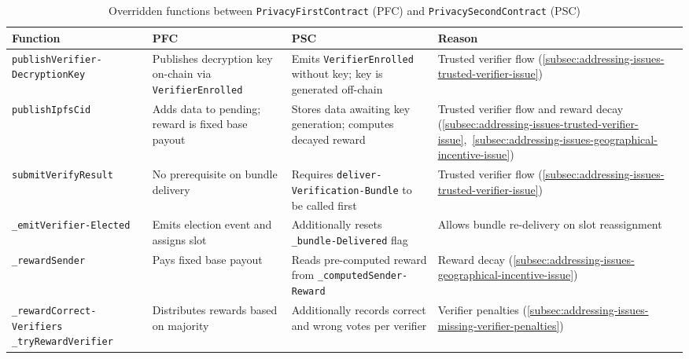 \begin{table}
    \centering
    \begin{tabular}{|p{4cm}|p{3.5cm}|p{3.5cm}|p{2.5cm}|}
        \hline
        \textbf{Function} & \textbf{PFC} & \textbf{PSC} & \textbf{Reason} \\
        \hline
        {\texttt{publishVerifier-\newline DecryptionKey}}
        & Publishes decryption key on-chain via \texttt{VerifierEnrolled}
        & Emits \texttt{VerifierEnrolled} without key; key is generated off-chain
        & Trusted verifier flow (\ref{subsec:addressing-issues-trusted-verifier-issue}) \\
        \hline
        \texttt{publishIpfsCid}
        & Adds data to pending; reward is fixed base payout
        & Stores data awaiting key generation; computes decayed reward
        & Trusted verifier flow and reward decay (\ref{subsec:addressing-issues-trusted-verifier-issue},~\ref{subsec:addressing-issues-geographical-incentive-issue}) \\
        \hline
        \texttt{submitVerifyResult}
        & No prerequisite on bundle delivery
        & Requires \texttt{deliver-\newline Verification-\newline Bundle} to be called first
        & Trusted verifier flow (\ref{subsec:addressing-issues-trusted-verifier-issue}) \\
        \hline
        \texttt{\_emitVerifier-\newline Elected}
        & Emits election event and assigns slot
        & Additionally resets \texttt{\_bundle-\newline Delivered} flag
        & Allows bundle re-delivery on slot reassignment \\
        \hline
        \texttt{\_rewardSender}
        & Pays fixed base payout
        & Reads pre-computed reward from \newline \texttt{\_computedSender-\newline Reward}
        & Reward decay (\ref{subsec:addressing-issues-geographical-incentive-issue}) \\
        \hline
        \texttt{\_rewardCorrect-\newline Verifiers} \newline \texttt{\_tryRewardVerifier}
        & Distributes rewards based on majority
        & Additionally records correct and wrong votes per verifier
        & Verifier penalties (\ref{subsec:addressing-issues-missing-verifier-penalties}) \\
        \hline
    \end{tabular}
    \caption{Overridden functions between \texttt{PrivacyFirstContract} (PFC) and \texttt{PrivacySecondContract} (PSC)}
    \label{tab:contract-implementation-hierarchy-overrides}
\end{table}


